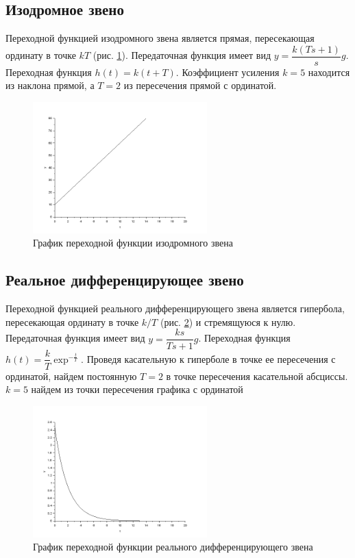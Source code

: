 \documentclass[a4paper,12pt,russian]{article} %
\begin{document}
\subsection{Изодромное звено}
Переходной функцией изодромного звена является прямая, пересекающая ординату в точке $kT$ (рис. \ref{plot_iso}). Передаточная функция имеет вид $y=\dfrac{k(Ts+1)}{s}g$. Переходная функция $h(t)=k(t+T)$. Коэффициент усиления $k=5$ находится из наклона прямой, а $T=2$ из пересечения прямой с ординатой. 
\begin{figure}[H]
	\centering\includegraphics[width=0.6\textwidth]{plot_iso.png}
	\caption{График переходной функции изодромного звена}\label{plot_iso}
\end{figure}

\subsection{Реальное дифференцирующее звено}
Переходной функцией реального дифференцирующего звена является гипербола, пересекающая ординату в точке $k/T$ (рис. \ref{plot_dif}) и стремящуюся к нулю. Передаточная функция имеет вид $y=\dfrac{ks}{Ts+1}g$. Переходная функция $h(t)=\dfrac{k}{T}\exp^{-\frac{t}{T}}$. Проведя касательную к гиперболе в точке ее пересечения с ординатой, найдем постоянную $T=2$ в точке пересечения касательной абсциссы. $k=5$ найдем из точки пересечения графика с ординатой
\begin{figure}[H]
	\centering\includegraphics[width=0.6\textwidth]{plot_dif}
	\caption{График переходной функции реального дифференцирующего звена}\label{plot_dif}
\end{figure}
\end{document}
